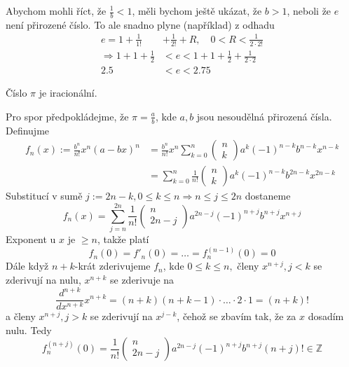 Abychom mohli říct, že $\frac{1}{b}<1$, měli bychom ještě ukázat, že $b>1$, neboli že $e$ není přirozené číslo. To ale snadno plyne (například) z odhadu
\begin{align*}
	e = 1+\frac{1}{1!}&+\frac{1}{2!}+R,\quad 0<R<\frac{1}{2\cdot 2!} \\
	\Rightarrow  1+1+\frac{1}{2}&<e<1+1+\frac{1}{2}+\frac{1}{2\cdot 2} \\
	2.5&<e<2.75 
\end{align*}

\begin{věta}
  Číslo $\pi$ je iracionální.
\end{věta}
\begin{důkaz}
  Pro spor předpokládejme, že $\pi=\frac{a}{b}$, kde $a,b$ jsou nesoudělná přirozená čísla. Definujme
  \begin{align*}
	  f_n(x):=\frac{b^{n}}{n!}x^{n}(a-bx)^{n}&=\frac{b^{n}}{n!}x^{n}\sum_{k=0}^{n}\begin{pmatrix}n\\ k\end{pmatrix}a^{k}(-1)^{n-k}b^{n-k}x^{n-k} \\
	  &=\sum_{k=0}^{n}\frac{1}{n!}\begin{pmatrix}n\\ k\end{pmatrix}a^{k}(-1)^{n-k}b^{2n-k}x^{2n-k}
  \end{align*}
  Substitucí v sumě $j:=2n-k, 0\leq k\leq n \Rightarrow n\leq j\leq 2n$ dostaneme
  \begin{equation*}
  f_n(x)=\sum_{j=n}^{2n}\frac{1}{n!}\begin{pmatrix}n\\ 2n-j\end{pmatrix}a^{2n-j}(-1)^{n+j}b^{n+j}x^{n+j}
  \end{equation*}
  Exponent u $x$ je $\geq n$, takže platí
  \begin{equation*}
    f_n(0)=f'_n(0)=\hdots=f^{(n-1)}_n(0)=0
  \end{equation*}
  Dále když $n+k$-krát zderivujeme $f_n$, kde $0\leq k\leq n,$ členy $x^{n+j}, j<k$ se zderivují na nulu, $x^{n+k}$ se zderivuje na
  \begin{equation*}
    \frac{d^{n+k}}{dx^{n+k}}x^{n+k}=(n+k)(n+k-1)\cdot\hdots\cdot2\cdot1=(n+k)!
  \end{equation*}
  a členy $x^{n+j}, j>k$ se zderivují na $x^{j-k}$, čehož se zbavím tak, že za $x$ dosadím nulu. Tedy
  \begin{equation*}
	  f_n^{(n+j)}(0)=\frac{1}{n!}\begin{pmatrix}n\\ 2n-j\end{pmatrix}a^{2n-j}(-1)^{n+j}b^{n+j}(n+j)! \in \mathbb{Z}

\end{equation*}
\end{důkaz}
